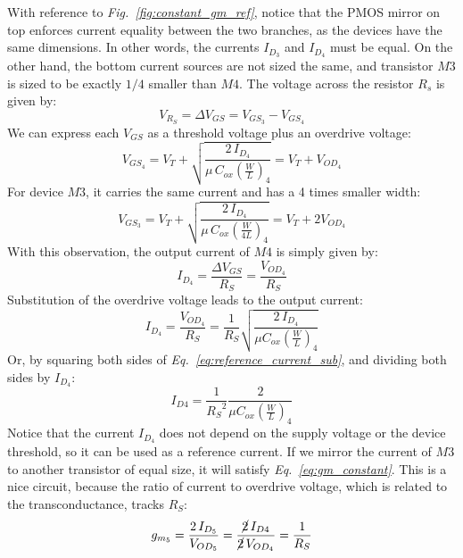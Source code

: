 With reference to \emph{Fig.~\ref{fig:constant_gm_ref}}, notice that the PMOS mirror on top enforces current equality between the two branches, as the devices have the same dimensions.  In other words, the currents $I_{D_3}$ and $I_{D_4}$ must be equal.  On the other hand, the bottom current sources are not sized the same, and transistor $M3$ is sized to be exactly $1/4$ smaller than $M4$.  The voltage across the resistor $R_s$ is given by:
    \begin{equation}
        V_{R_S} = \Delta V_{GS} = V_{GS_3} - V_{GS_4}
    \end{equation}
We can express each $V_{GS}$ as a threshold voltage plus an overdrive voltage:
    \begin{equation}
        V_{GS_4} = V_T + \sqrt{\frac{2\,I_{D_4}}{\mu\,C_{ox} \left(\frac{W}{L}\right)_4}} = V_T + V_{OD_4}
    \end{equation}
For device $M3$, it carries the same current and has a 4 times smaller width:
    \begin{equation}
        V_{GS_3} = V_T + \sqrt{\frac{2\,I_{D_4}}{\mu\,C_{ox} \left(\frac{W}{4L}\right)_4}} = V_T + 2V_{OD_4}
    \end{equation}
With this observation, the output current of $M4$ is simply given by:
    \begin{equation}
        I_{D_4} = \frac{\Delta V_{GS}}{R_S} = \frac{V_{OD_4}}{R_S}
        \label{eq:gm_constant}
    \end{equation}
Substitution of the overdrive voltage leads to the output current:
    \begin{equation}
        I_{D_4} = \frac{V_{OD_4}}{R_S} = \frac{1}{R_S} \sqrt{\frac{2\,I_{D_4}}{\mu C_{ox} \left(\frac{W}{L}\right)_4}}
        \label{eq:reference_current_sub}
    \end{equation}
Or, by squaring both sides of \emph{Eq.~\ref{eq:reference_current_sub}}, and dividing both sides by $I_{D_4}$:
    \begin{equation}
        I_{D4} = \frac{1}{{R_S}^2} \frac{2}{\mu C_{ox} \left(\frac{W}{L}\right)_4}
    \end{equation}	
Notice that the current $I_{D_4}$ does not depend on the supply voltage or the device threshold, so it can be used as a reference current.  If we mirror the current of $M3$ to another transistor of equal size, it will satisfy \emph{Eq.~\ref{eq:gm_constant}}.  This is a nice circuit, because the ratio of current to overdrive voltage, which is related to the transconductance, tracks $R_S$:
    \begin{equation}
        g_{m_5} = \frac{2\,I_{D_5}}{V_{OD_5}} = \frac{\cancel{2}\,I_{D4}}{\cancel{2}\,V_{OD_4}} = \frac{1}{R_S}
    \end{equation}
